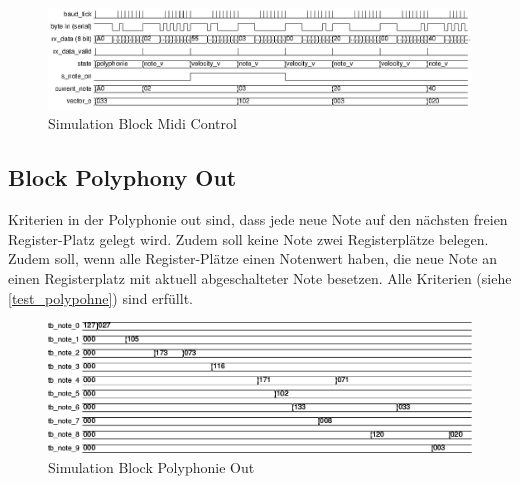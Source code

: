 \begin{figure}[H]
	\includegraphics[width=1\textwidth]{images/midi_control/wave_polyphonie.png}
	\caption{Simulation Block Midi Control}
	\label{fig.test_midi:control}
\end{figure} 

\subsection{Block Polyphony Out}
Kriterien in der Polyphonie out sind, dass jede neue Note auf den nächsten freien Register-Platz gelegt wird. Zudem soll keine Note zwei Registerplätze belegen. Zudem soll, wenn alle Register-Plätze einen Notenwert haben, die neue Note an einen Registerplatz mit aktuell abgeschalteter Note besetzen.
Alle Kriterien (siehe \ref {test_polypohne}) sind erfüllt.\\

\begin{figure}[H]
	\includegraphics[width=1\textwidth]{images/midi_interface/tb_polyphonie.png}
	\caption{Simulation Block Polyphonie Out}
	\label{fig.test_polyphonie}
\end{figure} 

